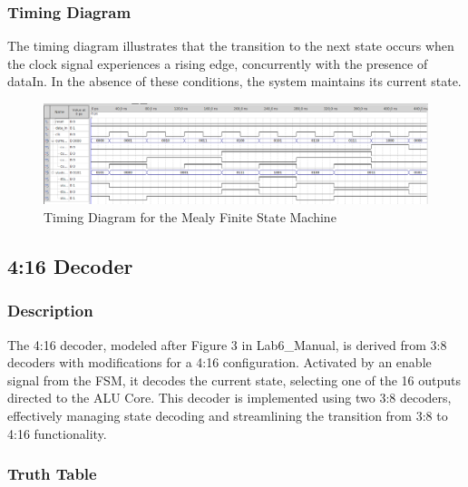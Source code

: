 	\subsubsection{{Timing Diagram}}
	
		{The timing diagram illustrates that the transition to the next state occurs when the clock signal experiences a rising edge, concurrently with the presence of dataIn. In the absence of these conditions, the system maintains its current state.}

		\begin{figure}[H]
			\centering
			\includegraphics[width=15cm]{Pictures/FSMWaveForm.png}
			\caption{{Timing Diagram for the Mealy Finite State Machine}}
			\label{FSM}
		\end{figure}

\subsection{{4:16 Decoder}}

	\subsubsection{{Description}}
	
		{The 4:16 decoder, modeled after Figure 3 in Lab6\_Manual, is derived from 3:8 decoders with modifications for a 4:16 configuration. Activated by an enable signal from the FSM, it decodes the current state, selecting one of the 16 outputs directed to the ALU Core. This decoder is implemented using two 3:8 decoders, effectively managing state decoding and streamlining the transition from 3:8 to 4:16 functionality.}
	
	\subsubsection{{Truth Table}}
	

